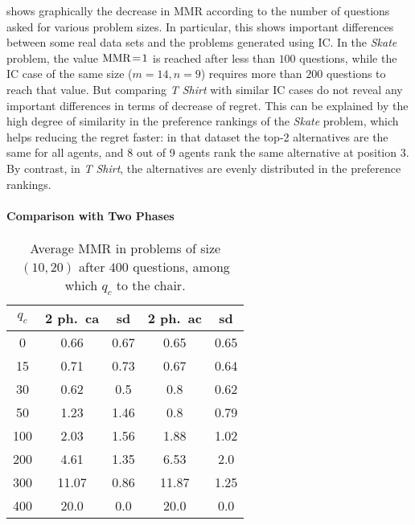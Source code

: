 \documentclass{article}
\begin{document}
 shows graphically the decrease in MMR according to the number of questions asked for various problem sizes. In particular, this shows important differences between some real data sets and the problems generated using IC.
In the \textit{Skate} problem, the value $\operatorname{MMR}\!=\!1$ is reached after less than $100$ questions, while the IC case of the same size ($m = 14, n = 9$) requires more than $200$ questions to reach that value. But comparing \textit{T Shirt} with similar IC cases do not reveal any important differences in terms of decrease of regret. This can be explained by the high degree of similarity in the preference rankings of the \textit{Skate} problem, which helps reducing the regret faster: in that dataset the top-2 alternatives are the same for all agents, and 8 out of 9 agents rank the same alternative at position 3. By contrast, in \textit{T Shirt}, the alternatives are evenly distributed in the preference rankings. 
 
\paragraph{Comparison with Two Phases}

\begin{table}
	\caption{Average MMR in problems of size $(10, 20)$ after $400$ questions, among which $q_c$ to the chair.}
	\label{tab:twoP400}
	\begin{tabular}{S[table-figures-integer=3, table-figures-decimal=0]S[table-number-alignment = right]@{ ± }S[table-number-alignment = left, table-figures-integer=1]S[table-number-alignment = right]@{ ± }S[table-number-alignment = left, table-figures-integer=1]}
		\toprule
		{$q_c$} & {2 ph.\ ca} & {sd} & {2 ph.\ ac} & {sd} \\
		 & 0.66 & 0.67 & 0.65 & 0.65  \\
		15 & 0.71 & 0.73 & 0.67	& 0.64 \\
		30 & 0.62 & 0.5 & 0.8 & 0.62 \\
		50 & 1.23 & 1.46 & 0.8 & 0.79 \\
		100 & 2.03 & 1.56 & 1.88 & 1.02  \\
		200 & 4.61	& 1.35  & 6.53 & 2.0  \\
		300 &11.07 & 0.86& 11.87 & 1.25 \\
		400 &20.0 & 0.0 & 20.0 & 0.0 \\
		\bottomrule
	\end{tabular}
\end{table}
\end{document}
